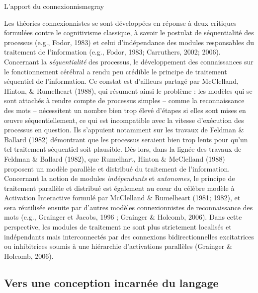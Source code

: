 \documentclass[
  a4paper,12pt,twoside,onecolumn,openright,final,oldfontcommands]{memoir}
\newcommand\chaptercolor{gray}
\begin{document}
\begin{mybox}[label = connexionnisme]{L'apport du connexionnisme}{\chaptercolor}

Les théories connexionnistes se sont développées en réponse à deux critiques formulées contre le cognitivisme classique, à savoir le postulat de séquentialité des processus (e.g., Fodor, 1983) et celui d’indépendance des modules responsables du traitement de l’information (e.g., Fodor, 1983; Carruthers, 2002; 2006).\\

Concernant la  \textit{séquentialité} des processus, le développement des connaissances sur le fonctionnement cérébral a rendu peu crédible le principe de traitement séquentiel de l’information. Ce constat est d’ailleurs partagé par McClelland, Hinton, \& Rumelheart (1988), qui résument ainsi le problème : les modèles qui se sont attachés à rendre compte de processus simples – comme la reconnaissance des mots – nécessitent un nombre bien trop élevé d’étapes si elles sont mises en \oe uvre séquentiellement, ce qui est incompatible avec la vitesse d’exécution des processus en question. Ils s’appuient notamment sur les travaux de Feldman \& Ballard (1982) démontrant que les processus seraient bien trop lents pour qu’un tel traitement séquentiel soit plausible. Dès lors, dans la lignée des travaux de Feldman \& Ballard (1982), que Rumelhart, Hinton \& McClelland (1988) proposent un modèle parallèle et distribué du traitement de l'information.\\

Concernant la notion de modules \textit{indépendants} et \textit{autonomes}, le principe de traitement parallèle et distribué est également au cœur du célèbre modèle à Activation Interactive formulé par McClelland \& Rumelheart (1981; 1982), et sera réutilisée ensuite par d’autres modèles connexionnistes de reconnaissance des mots (e.g., Grainger et Jacobs, 1996 ; Grainger \& Holcomb, 2006). Dans cette perspective, les modules de traitement ne sont plus strictement localisés et indépendants mais interconnectés par des connexions bidirectionnelles excitatrices ou inhibitrices soumis à une hiérarchie d’activations parallèles (Grainger \& Holcomb, 2006). 

\end{mybox}

\hypertarget{vers-une-conception-incarnuxe9e-du-langage}{%
\subsection{Vers une conception incarnée du langage}\label{vers-une-conception-incarnuxe9e-du-langage}}
\end{document}
